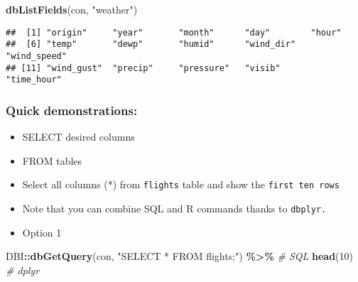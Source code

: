 \documentclass[
]{book}
\newenvironment{Shaded}{\begin{snugshade}}{\end{snugshade}}
\newcommand{\CommentTok}[1]{\textcolor[rgb]{0.56,0.35,0.01}{\textit{#1}}}
\newcommand{\DecValTok}[1]{\textcolor[rgb]{0.00,0.00,0.81}{#1}}
\newcommand{\KeywordTok}[1]{\textcolor[rgb]{0.13,0.29,0.53}{\textbf{#1}}}
\newcommand{\NormalTok}[1]{#1}
\newcommand{\OperatorTok}[1]{\textcolor[rgb]{0.81,0.36,0.00}{\textbf{#1}}}
\newcommand{\StringTok}[1]{\textcolor[rgb]{0.31,0.60,0.02}{#1}}
\begin{document}
\begin{Shaded}
\begin{Highlighting}[]
\KeywordTok{dbListFields}\NormalTok{(con, }\StringTok{"weather"}\NormalTok{)}
\end{Highlighting}
\end{Shaded}

\begin{verbatim}
##  [1] "origin"     "year"       "month"      "day"        "hour"      
##  [6] "temp"       "dewp"       "humid"      "wind_dir"   "wind_speed"
## [11] "wind_gust"  "precip"     "pressure"   "visib"      "time_hour"
\end{verbatim}

\hypertarget{quick-demonstrations}{%
\subsubsection{Quick demonstrations:}\label{quick-demonstrations}}

\begin{itemize}
\item
  SELECT desired columns
\item
  FROM tables
\item
  Select all columns (*) from \texttt{flights} table and show the \texttt{first\ ten\ rows}
\item
  Note that you can combine SQL and R commands thanks to \texttt{dbplyr.}
\item
  Option 1
\end{itemize}

\begin{Shaded}
\begin{Highlighting}[]
\NormalTok{DBI}\OperatorTok{::}\KeywordTok{dbGetQuery}\NormalTok{(con, }
                \StringTok{"SELECT * FROM flights;"}\NormalTok{) }\OperatorTok{\%\textgreater{}\%}\StringTok{ }\CommentTok{\# SQL}
\StringTok{  }\KeywordTok{head}\NormalTok{(}\DecValTok{10}\NormalTok{) }\CommentTok{\# dplyr }
\end{Highlighting}
\end{Shaded}
\end{document}
